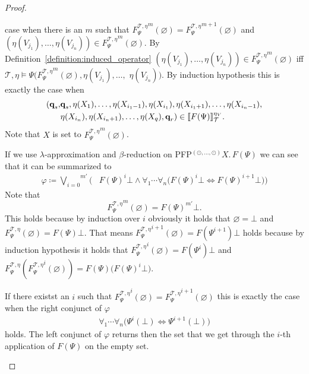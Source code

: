 \begin{proof}
\begin{compactitem}
        case when there is an $m$ such that ${F_\Psi^{\mathcal{T},\eta}}^m(\varnothing) = {F_\Psi^		
       {\mathcal{T},\eta}}^{m+1}(\varnothing)$ and $(\eta(V_{j_1}), \dots, \eta(V_{j_n})) \in {F_\Psi^{\mathcal{T},\eta}}^m(\varnothing)$. By Definition~\ref{definition:induced_operator} $(\eta(V_{j_1}), \dots, 		
        \eta(V_{j_n})) \in {F_\Psi^{\mathcal{T},\eta}}^m(\varnothing)$ iff $\mathcal{T}, \eta \models \Psi({F_\Psi^
       {\mathcal{T},\eta}}^{m}(\varnothing), \eta(V_{j_1}), \dots, $ $\eta(V_{j_n}))$. By induction hypothesis 
        this is exactly the case when 
\begin{align*}
        (\emph{q}_s, &\emph{q}_s, \eta(X_1), \dots, \eta(X_{i_1-1}), \eta(X_{i_1}), \eta(X_{i_1+1}), \dots, \eta(X_{i_n-1}), \\&\eta(X_{i_n}), \eta(X_{i_n+1}), \dots, \eta
            (X_q), \emph{q}_r) \in \llbracket
        F(\Psi) \rrbracket^{\eta_V}_\mathcal{T}.
        \end{align*}       
        Note that $X$ is set to ${F_\Psi^{\mathcal{T},\eta}}^{m}(\varnothing)$.
		         
         If we use $\lambda$-approximation and $\beta$-reduction on PFP$^{(\odot, \dots, \odot)} X.\,F(\Psi)$ we can 
         see that it can be summarized to
         \begin{align*}
         \varphi \coloneqq \overset{m'}{\underset{i=0}{\bigvee}} \Big(&F(\Psi)^i \bot \wedge \forall_1 \dotsb \forall_n
         \big(F(\Psi)^i \bot \Leftrightarrow F(\Psi)^{i+1} \bot \big)\Big)
         \end{align*}
		Note that 
		\[{F_\Psi^{\mathcal{T},\eta}}^m(\varnothing) = F(\Psi)^{m'} \bot.\] 
		This holds because by induction over $i$ obviously it holds that 
		$\varnothing = \bot$
		and 
		$F_\Psi^{\mathcal{T},\eta}(\varnothing) = F(\Psi) \bot.$
		That means 
		${F_\Psi^{\mathcal{T},\eta}}^{i+1}(\varnothing) = F(\Psi^{i+1}) \bot $
		holds because by induction hypothesis it holds that
		${F_\Psi^{\mathcal{T},\eta}}^{i}
		(\varnothing) = F(\Psi^{i}) \bot$
		and 
		$F_\Psi^{\mathcal{T},\eta}({F_\Psi^{\mathcal{T},\eta}}^{i}(\varnothing))= F(\Psi)\big(F(\Psi)^{i} \bot \big).$
		
		If there existst an $i$ such that ${F_\Psi^{\mathcal{T},\eta}}^i(\varnothing) = {F_\Psi^		
        {\mathcal{T},\eta}}^{i+1}(\varnothing)$ this is exactly the case when the right conjunct of $\varphi$
		\begin{align*}
		\forall_1 \dotsb \forall_n \big(\Psi^i(\bot) \Leftrightarrow \Psi^{i+1}(\bot)\big)
         \end{align*}
		holds. The left conjunct of $\varphi$ returns then the set that we get through  
		the $i$-th application of $F(\Psi)$ on the empty set.
		

\end{compactitem}
\end{proof}
